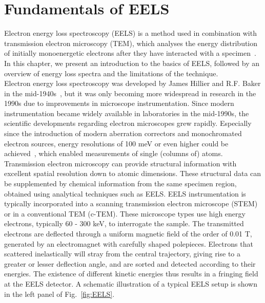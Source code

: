 \section{Fundamentals of EELS}
\label{sec:eels}

Electron energy loss spectroscopy (EELS) is a method used in combination with 
transmission electron microscopy (TEM), which analyses the 
energy distribution of initially monoenergetic electrons after
they have interacted with a specimen~\cite{Egerton:1996}. 
%
In this chapter, we present an introduction to the basics
of EELS, followed by an overview of energy loss spectra and 
the limitations of the technique.\\

Electron energy loss spectroscopy was developed by James Hillier and R.F. Baker in 
the mid-1940s~\cite{Hillier:1944},
but it was only becoming more widespread in research in the 1990s 
due to improvements in microscope instrumentation. 
%
Since modern instrumentation became widely available in laboratories in the
mid-1990s, the scientific developments regarding electron microscopes grew rapidly.
%
Especially since the introduction of modern aberration correctors
and monochromated electron sources, energy resolutions of 100 meV
or even higher could be achieved~\cite{Rose:2008},
which enabled measurements of single (columns of) atoms. 
%
Transmission electron microscopy can provide structural information 
with excellent spatial resolution down to atomic dimensions. 
These structural data can be supplemented by chemical information 
from the same specimen region, obtained using analytical techniques
such as EELS.
%
EELS instrumentation is typically incorporated into a scanning
transmission electron microscope (STEM) or in a conventional TEM (c-TEM).
%
These microscope types use high energy electrons, typically 60 - 300 keV, 
to interrogate the sample. 
%
The transmitted electrons are deflected through a uniform magnetic field 
of the order of 0.01 T, generated by an electromagnet with carefully shaped polepieces. 
%
Electrons that scattered inelastically will stray from the central trajectory, 
giving rise to a greater or lesser deflection angle, 
and are sorted and detected according to their energies. 
%
The existence of different kinetic energies thus results in a fringing 
field at the EELS detector.
%
A schematic illustration of a typical EELS setup is shown in the left panel of Fig.~\ref{fig:EELS}.
%

